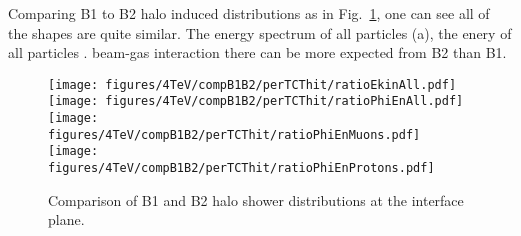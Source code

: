 Comparing B1 to B2 halo induced distributions as in Fig.~\ref{comp4TeVB1B2}, one can see all of the shapes are quite similar. The energy spectrum of all particles (a), the enery of all particles  . beam-gas interaction there can be more expected from B2 than B1.


\begin{figure}[!htb]
\begin{center}
\texttt{[image: figures/4TeV/compB1B2/perTCThit/ratioEkinAll.pdf]}
\texttt{[image: figures/4TeV/compB1B2/perTCThit/ratioPhiEnAll.pdf]}
\texttt{[image: figures/4TeV/compB1B2/perTCThit/ratioPhiEnMuons.pdf]}
\texttt{[image: figures/4TeV/compB1B2/perTCThit/ratioPhiEnProtons.pdf]}
\end{center}
\vspace{-0.6cm}
 \caption{Comparison of B1 and B2 halo shower distributions at the interface plane.
  \label{comp4TeVB1B2}}
\end{figure}




